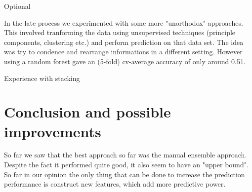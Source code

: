 \documentclass[fleqn]{article}
\begin{document}
Optional 

In the late process we experimented with some more "unorthodox" approaches. This involved tranforming the data using unsupervised techniques (principle components, clustering etc.) and perform prediction on that data set. The idea was try to condence and rearrange informations in a different setting. However using a random forest gave an (5-fold) cv-average accuracy of only around 0.51. 

Experience with stacking

\section*{Conclusion and possible improvements}

So far we saw that the best approach so far was the manual ensemble approach. Despite the fact it performed quite good, it also seem to have an "upper bound".  So far in our opinion the only thing that can be done to increase the prediction performance is construct new features, which add more predictive power. 
\begin{table}[!h]
	\centering
	\caption{Overview of Methods and results}
	\vspace{0.3cm}
	\vspace{0.3cm}
	\raggedright
	\label{tab1}
\end{table}
\end{document}
